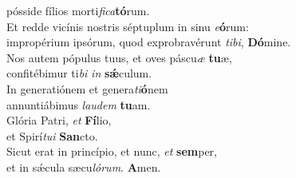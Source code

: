 \evenverse pósside fílios morti\textit{fi}\textit{ca}\textbf{tó}rum.\\
\oddverse Et redde vicínis nostris séptuplum in sinu \textit{e}\textbf{ó}rum:~\*\\
\oddverse impropérium ipsórum, quod exprobravérunt \textit{ti}\textit{bi}, \textbf{Dó}mine.\\
\evenverse Nos autem pópulus tuus, et oves páscu\textit{æ} \textbf{tu}æ,~\*\\
\evenverse confitébimur ti\textit{bi} \textit{in} \textbf{sǽ}culum.\\
\oddverse In generatiónem et genera\textit{ti}\textbf{ó}nem~\*\\
\oddverse annuntiábimus \textit{lau}\textit{dem} \textbf{tu}am.\\
\evenverse Glória Patri, \textit{et} \textbf{Fí}lio,~\*\\
\evenverse et Spirí\textit{tu}\textit{i} \textbf{San}cto.\\
\oddverse Sicut erat in princípio, et nunc, \textit{et} \textbf{sem}per,~\*\\
\oddverse et in sǽcula sæcu\textit{ló}\textit{rum}. \textbf{A}men.\\
